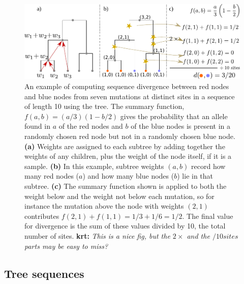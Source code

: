 \documentclass{article}
\newcommand{\krt}[1]{{\color{green}\textbf{krt:} \it #1}}
\begin{document}
\begin{figure}
    \centering
    \includegraphics{figures/divergence_diagram}
    \caption{
        An example of computing sequence divergence between red nodes and blue nodes
        from seven mutations at distinct sites in a sequence of length 10 using the tree.
        The summary function, $f(a,b) = (a/3)(1-b/2)$ gives the probability that
        an allele found in $a$ of the red nodes and $b$ of the blue nodes is present in
        a randomly chosen red node but not in a randomly chosen blue node.
        \textbf{(a)} Weights are assigned to each subtree by adding together the weights of any children,
        plus the weight of the node itself, if it is a sample.
        \textbf{(b)} In this example, subtree weights $(a,b)$ record how many red nodes ($a$)
        and how many blue nodes ($b$) lie in that subtree.
        \textbf{(c)} The summary function shown is applied to both the weight below
        and the weight not below each mutation,
        so for instance the mutation above the node with weights $(2,1)$
        contributes $f(2,1) + f(1,1) = 1/3 + 1/6 = 1/2$.
        The final value for divergence is the sum of these values divided by 10,
        the total number of sites.
        \krt{This is a nice fig, but the $2 \times$ and the $/10 sites$ parts may be easy to miss?}
        \label{fig:divergence_diagram}
    }
\end{figure}


\subsection*{Tree sequences}
\end{document}

